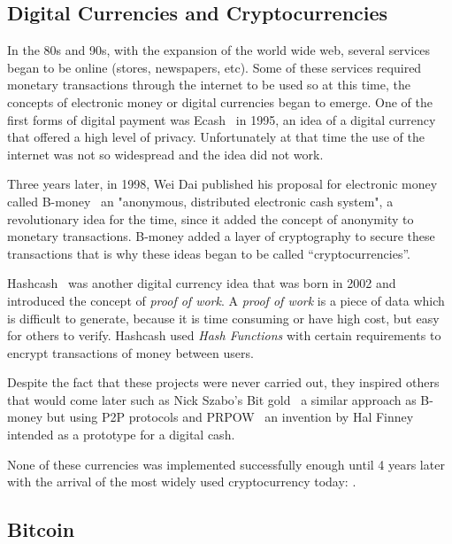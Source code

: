 \subsection{Digital Currencies and Cryptocurrencies}
\label{tb:cryptos}

In the 80s and 90s, with the expansion of the world wide web, several services
began to be online (stores, newspapers, etc). Some of these services required
monetary transactions through the internet to be used so at this time, the
concepts of electronic money or digital currencies began to emerge. One of the
first forms of digital payment was Ecash~\cite{chaum1995introduction} in 1995,
an idea of a digital currency that offered a high level of privacy.
Unfortunately at that time the use of the internet was not so widespread and the
idea did not work.

Three years later, in 1998, Wei Dai published his proposal for electronic money
called B-money~\cite{dai1998b} an "anonymous, distributed electronic cash
system", a revolutionary idea for the time, since it added the concept of
anonymity to monetary transactions. B-money added a layer of cryptography to
secure these transactions that is why these ideas began to be called
``cryptocurrencies''.

Hashcash~\cite{back2002hashcash} was another digital currency idea that was born
in 2002 and introduced the concept of \emph{proof of work}. A \emph{proof of
  work} is a piece of data which is difficult to generate, because it is time
consuming or have high cost, but easy for others to verify. Hashcash used
\emph{Hash Functions} with certain requirements to encrypt transactions of money
between users.

Despite the fact that these projects were never carried out, they inspired
others that would come later such as Nick Szabo's Bit gold~\cite{szabo2008bit} a
similar approach as B-money but using P2P protocols and
PRPOW~\cite{finney2005rpow} an invention by Hal Finney intended as a prototype
for a digital cash.

None of these currencies was implemented successfully enough until 4 years later
with the arrival of the most widely used cryptocurrency today: .

\subsection{Bitcoin}
\label{tb:bc}


